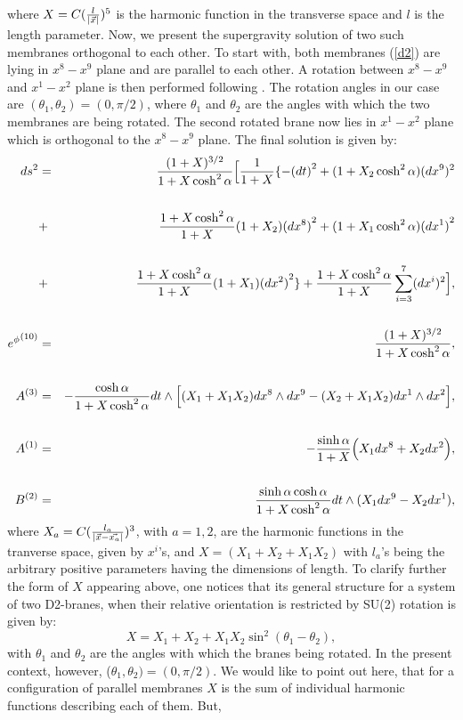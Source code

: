 \documentclass[a4paper,12pt,fleqn,cite,epsfig]{article}
\begin{document}
where $X = C ({l \over{|\vec{x}|}})^{5}$ is the harmonic function in
the transverse space and $l$ is the length parameter.
Now, we present the supergravity solution of two such membranes orthogonal 
to each other. To start with, both membranes (\ref{d2}) are lying 
in $x^8-x^9$ plane and are parallel to each other. 
A rotation between $x^8-x^9$ and $x^1-x^2$
plane is then performed following \cite{myers1}. 
The rotation angles in our case 
are $(\theta_1, \theta_2) = (0, \pi/2)$, where $\theta_1$ and
$\theta_2$ are the angles with which the two membranes are being
rotated. The second rotated brane now lies in $x^1-x^2$ plane which
is orthogonal to the $x^8-x^9$ plane. The final solution is given by:  
\begin{eqnarray}
ds^2 &=& {(1 + X)^{3/2}\over {1 + X \cosh^2 \alpha}}\Big[{1\over {1 +
    X}}\{ -{(dt)}^2 + ( 1 + X_2 \cosh^2 \alpha){(dx^9)^2}\cr
& \cr 
&+& {{1 + X \cosh^2 \alpha}\over {1 + X}}(1 + X_2){(dx^8)}^2 
+ (1 + X_1 \cosh^2 \alpha){(dx^1)}^2 \cr
& \cr
&+& {{1 + X \cosh^2 \alpha}\over {1 + X}}(1 + X_1){(dx^2)}^2\} + 
{{1 + X \cosh^2 \alpha}\over {1 + X}}\sum_{i=3}^{7} ({dx^i})^2\Big],\cr
& \cr
{e^{\phi}}^{(10)} &=& {(1 + X)^{3/2}\over {1 + X \cosh^2 \alpha}},\cr
& \cr
A^{(3)} &=& - {\cosh \alpha\over{1 + X \cosh^2\alpha}}dt \wedge
\Big[(X_1 + X_1 X_2)dx^8 \wedge dx^9 - (X_2 + X_1 X_2)dx^1 \wedge
dx^2\Big],\cr
& \cr
A^{(1)} &=& - {\sinh\alpha\over{1 + X}}\Big( X_1 dx^8 + X_2 dx ^2
\Big),\cr
& \cr
B^{(2)} &=& {\sinh\alpha\cosh\alpha\over{1 +
X\cosh^2\alpha}}dt \wedge(X_1 dx^9 - X_2 dx^1),
\label{per-D2}
\end{eqnarray}
where $X_{a} = C ({l_a \over{|\vec{x} - \vec{x_{a}}|}})^{3}$,
with $a = 1, 2$, are the harmonic functions in the tranverse space,
given by $x^i$'s, and $ X = ( X_1 + X_2 + X_1 X_2)$\cite{myers1,hambli} with
$l_a$'s being the arbitrary
positive parameters having the dimensions of length. 
To clarify further the form of $X$ appearing above, one notices that
its general structure for a system of two D2-branes, 
when their relative orientation is restricted by SU(2) rotation
is given by\cite{myers1,hambli,vijay}:
\begin{equation}
X = X_1 + X_2 + X_1 X_2 \sin^2(\theta_1 - \theta_2),
\end{equation}
with $\theta_1$ and $\theta_2$ are the angles with which the branes
being rotated. In the present context, however, 
($\theta_1, \theta_2) = (0, \pi/2)$. 
We would like to point out here, that for a configuration of
parallel membranes $X$ is the sum of individual 
harmonic functions describing each of them. But, 
\end{document}
